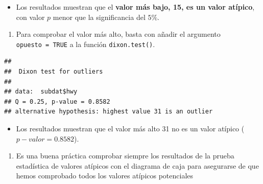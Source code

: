 \documentclass[
]{book}
\newenvironment{Shaded}{\begin{snugshade}}{\end{snugshade}}
\newcommand{\AttributeTok}[1]{\textcolor[rgb]{0.13,0.29,0.53}{#1}}
\newcommand{\ConstantTok}[1]{\textcolor[rgb]{0.56,0.35,0.01}{#1}}
\newcommand{\FunctionTok}[1]{\textcolor[rgb]{0.13,0.29,0.53}{\textbf{#1}}}
\newcommand{\NormalTok}[1]{#1}
\newcommand{\OtherTok}[1]{\textcolor[rgb]{0.56,0.35,0.01}{#1}}
\newcommand{\SpecialCharTok}[1]{\textcolor[rgb]{0.81,0.36,0.00}{\textbf{#1}}}
\newcommand{\StringTok}[1]{\textcolor[rgb]{0.31,0.60,0.02}{#1}}
\providecommand{\tightlist}{%
  \setlength{\itemsep}{0pt}\setlength{\parskip}{0pt}}
\begin{document}
\begin{itemize}
\tightlist
\item
  Los resultados muestran que el \textbf{valor más bajo, 15, es un valor atípico}, con valor \(p\) menor que la significancia del \(5\%\).
\end{itemize}

\begin{enumerate}
\def\labelenumi{\arabic{enumi}.}
\setcounter{enumi}{1}
\tightlist
\item
  Para comprobar el valor más alto, basta con añadir el argumento \texttt{opuesto\ =\ TRUE} a la función \texttt{dixon.test()}.
\end{enumerate}

\begin{Shaded}
\end{Shaded}

\begin{verbatim}
## 
##  Dixon test for outliers
## 
## data:  subdat$hwy
## Q = 0.25, p-value = 0.8582
## alternative hypothesis: highest value 31 is an outlier
\end{verbatim}

\begin{itemize}
\tightlist
\item
  Los resultados muestran que el valor más alto 31 no es un valor atípico (\(p-valor = 0.8582\)).
\end{itemize}

\begin{enumerate}
\def\labelenumi{\arabic{enumi}.}
\setcounter{enumi}{2}
\tightlist
\item
  Es una buena práctica comprobar siempre los resultados de la prueba estadística de valores atípicos con el diagrama de caja para asegurarse de que hemos comprobado todos los valores atípicos potenciales
\end{enumerate}

\begin{Shaded}
\end{Shaded}
\end{document}
